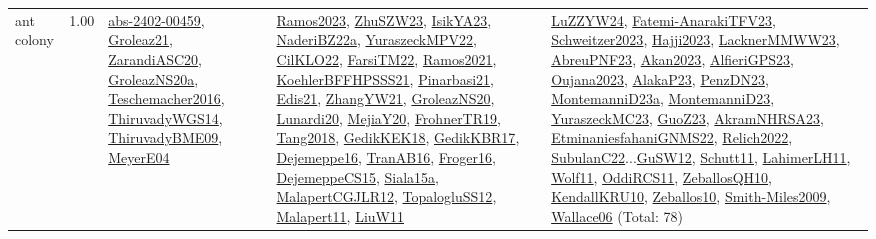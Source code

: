 {\begin{longtable}{p{3cm}r>{\raggedright\arraybackslash}p{6cm}>{\raggedright\arraybackslash}p{6cm}>{\raggedright\arraybackslash}p{8cm}}
\index{ant colony}\index{Algorithms!ant colony}ant colony &  1.00 & \hyperref[detail:abs-2402-00459]{abs-2402-00459}, \hyperref[detail:Groleaz21]{Groleaz21}, \hyperref[detail:ZarandiASC20]{ZarandiASC20}, \hyperref[detail:GroleazNS20a]{GroleazNS20a}, \hyperref[detail:Teschemacher2016]{Teschemacher2016}, \hyperref[detail:ThiruvadyWGS14]{ThiruvadyWGS14}, \hyperref[detail:ThiruvadyBME09]{ThiruvadyBME09}, \hyperref[detail:MeyerE04]{MeyerE04} & \hyperref[detail:Ramos2023]{Ramos2023}, \hyperref[detail:ZhuSZW23]{ZhuSZW23}, \hyperref[detail:IsikYA23]{IsikYA23}, \hyperref[detail:NaderiBZ22a]{NaderiBZ22a}, \hyperref[detail:YuraszeckMPV22]{YuraszeckMPV22}, \hyperref[detail:CilKLO22]{CilKLO22}, \hyperref[detail:FarsiTM22]{FarsiTM22}, \hyperref[detail:Ramos2021]{Ramos2021}, \hyperref[detail:KoehlerBFFHPSSS21]{KoehlerBFFHPSSS21}, \hyperref[detail:Pinarbasi21]{Pinarbasi21}, \hyperref[detail:Edis21]{Edis21}, \hyperref[detail:ZhangYW21]{ZhangYW21}, \hyperref[detail:GroleazNS20]{GroleazNS20}, \hyperref[detail:Lunardi20]{Lunardi20}, \hyperref[detail:MejiaY20]{MejiaY20}, \hyperref[detail:FrohnerTR19]{FrohnerTR19}, \hyperref[detail:Tang2018]{Tang2018}, \hyperref[detail:GedikKEK18]{GedikKEK18}, \hyperref[detail:GedikKBR17]{GedikKBR17}, \hyperref[detail:Dejemeppe16]{Dejemeppe16}, \hyperref[detail:TranAB16]{TranAB16}, \hyperref[detail:Froger16]{Froger16}, \hyperref[detail:DejemeppeCS15]{DejemeppeCS15}, \hyperref[detail:Siala15a]{Siala15a}, \hyperref[detail:MalapertCGJLR12]{MalapertCGJLR12}, \hyperref[detail:TopalogluSS12]{TopalogluSS12}, \hyperref[detail:Malapert11]{Malapert11}, \hyperref[detail:LiuW11]{LiuW11} & \hyperref[detail:LuZZYW24]{LuZZYW24}, \hyperref[detail:Fatemi-AnarakiTFV23]{Fatemi-AnarakiTFV23}, \hyperref[detail:Schweitzer2023]{Schweitzer2023}, \hyperref[detail:Hajji2023]{Hajji2023}, \hyperref[detail:LacknerMMWW23]{LacknerMMWW23}, \hyperref[detail:AbreuPNF23]{AbreuPNF23}, \hyperref[detail:Akan2023]{Akan2023}, \hyperref[detail:AlfieriGPS23]{AlfieriGPS23}, \hyperref[detail:Oujana2023]{Oujana2023}, \hyperref[detail:AlakaP23]{AlakaP23}, \hyperref[detail:PenzDN23]{PenzDN23}, \hyperref[detail:MontemanniD23a]{MontemanniD23a}, \hyperref[detail:MontemanniD23]{MontemanniD23}, \hyperref[detail:YuraszeckMC23]{YuraszeckMC23}, \hyperref[detail:GuoZ23]{GuoZ23}, \hyperref[detail:AkramNHRSA23]{AkramNHRSA23}, \hyperref[detail:EtminaniesfahaniGNMS22]{EtminaniesfahaniGNMS22}, \hyperref[detail:Relich2022]{Relich2022}, \hyperref[detail:SubulanC22]{SubulanC22}...\hyperref[detail:GuSW12]{GuSW12}, \hyperref[detail:Schutt11]{Schutt11}, \hyperref[detail:LahimerLH11]{LahimerLH11}, \hyperref[detail:Wolf11]{Wolf11}, \hyperref[detail:OddiRCS11]{OddiRCS11}, \hyperref[detail:ZeballosQH10]{ZeballosQH10}, \hyperref[detail:KendallKRU10]{KendallKRU10}, \hyperref[detail:Zeballos10]{Zeballos10}, \hyperref[detail:Smith-Miles2009]{Smith-Miles2009}, \hyperref[detail:Wallace06]{Wallace06} (Total: 78)\\

\end{longtable}}
